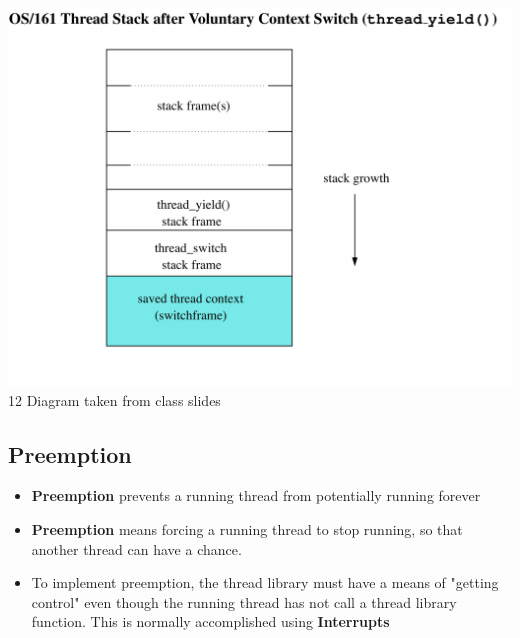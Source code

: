 \documentclass[twoside]{article}
\begin{document}
\begin{center}
\includegraphics[scale=0.2]{2}\\12
Diagram taken from class slides 
\end{center}

\subsection{Preemption}
\begin{itemize}
\item \textbf{Preemption} prevents a running thread from potentially running forever 
\item \textbf{Preemption} means forcing a running thread to stop running, so that another thread can have a chance. 
\item To implement preemption, the thread library must have a means of "getting control" even though the running thread has not call a thread library function. This is normally accomplished using \textbf{Interrupts}
\end{itemize}
\end{document}
